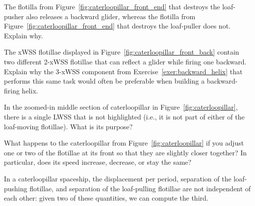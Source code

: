 \begin{multicols}{2}
\mfilbreak


\begin{problemstar}\label{exer:caterloopillar_front_end_glider} 
	The flotilla from Figure~\ref{fig:caterloopillar_front_end} that destroys the loaf-pusher also releases a backward glider, whereas the flotilla from Figure~\ref{fig:caterloopillar_front_end} that destroys the loaf-puller does not. Explain why.
	
\end{problemstar}


\mfilbreak


\begin{problemstar}\label{exer:helix_components_from_caterloopillar} 
	The xWSS flotillae displayed in Figure~\ref{fig:caterloopillar_front_back} contain two different 2-xWSS flotillae that can reflect a glider while firing one backward. Explain why the 3-xWSS component from Exercise~\ref{exer:backward_helix} that performs this same task would often be preferable when building a backward-firing helix.
\end{problemstar}


\mfilbreak


\begin{problemstar}\label{exer:caterloopillar_lonely_lwss} 
	In the zoomed-in middle section of caterloopillar in Figure~\ref{fig:caterloopillar}, there is a single LWSS that is not highlighted (i.e., it is not part of either of the loaf-moving flotillae). What is its purpose?
\end{problemstar}


\mfilbreak


\begin{problem}\label{exer:caterloopillar_adjust_one_flotilla} 
	What happens to the caterloopillar from Figure~\ref{fig:caterloopillar} if you adjust one or two of the flotillae at its front so that they are slightly closer together? In particular, does its speed increase, decrease, or stay the same?
\end{problem}


\mfilbreak


\begin{problem}\label{exer:caterloopillar_calc_flotillae_spacing} 
	In a caterloopillar spaceship, the displacement per period, separation of the loaf-pushing flotillae, and separation of the loaf-pulling flotillae are not independent of each other: given two of these quantities, we can compute the third.\smallskip
	

\end{problem}
\end{multicols}

